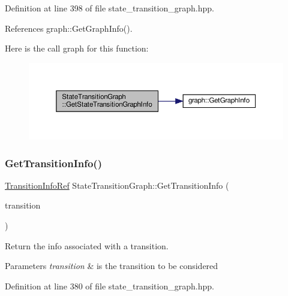 Definition at line 398 of file state\+\_\+transition\+\_\+graph.\+hpp.



References graph\+::\+Get\+Graph\+Info().

Here is the call graph for this function\+:
\nopagebreak
\begin{figure}[H]
\begin{center}
\leavevmode
\includegraphics[width=350pt]{d9/d86/structStateTransitionGraph_add57cbde382f489d241dd24485435505_cgraph}
\end{center}
\end{figure}
\mbox{\label{structStateTransitionGraph_a5c3eccee5a4b0b87a416a8829f7a96d7}} 
\subsubsection{\texorpdfstring{Get\+Transition\+Info()}{GetTransitionInfo()}}
{\footnotesize\ttfamily \hyperlink{state__transition__graph_8hpp_a4406374514e349d48b6dd148b6977b53}{Transition\+Info\+Ref} State\+Transition\+Graph\+::\+Get\+Transition\+Info (\begin{DoxyParamCaption}\item[{const \hyperlink{graph_8hpp_a9eb9afea34e09f484b21f2efd263dd48}{Edge\+Descriptor}}]{transition }\end{DoxyParamCaption})\hspace{0.3cm}{\ttfamily [inline]}}



Return the info associated with a transition. 


\begin{DoxyParams}{Parameters}
{\em transition} & is the transition to be considered \\
\hline
\end{DoxyParams}


Definition at line 380 of file state\+\_\+transition\+\_\+graph.\+hpp.



